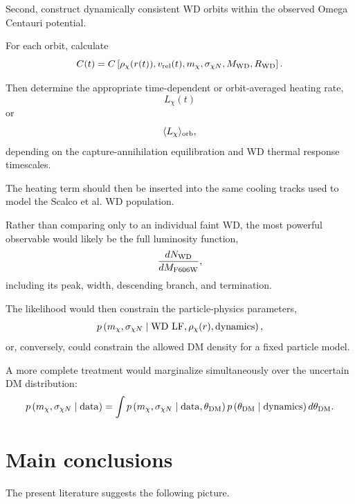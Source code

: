 \documentclass[11pt,a4paper]{article}
\begin{document}
Second, construct dynamically consistent WD orbits within the observed Omega Centauri potential.

For each orbit, calculate
\begin{equation}
C(t)
=
C\left[
\rho_\chi(r(t)),
v_{\rm rel}(t),
m_\chi,
\sigma_{\chi N},
M_{\rm WD},
R_{\rm WD}
\right].
\end{equation}

Then determine the appropriate time-dependent or orbit-averaged heating rate,
\begin{equation}
L_\chi(t)
\end{equation}
or
\begin{equation}
\langle L_\chi\rangle_{\rm orb},
\end{equation}
depending on the capture-annihilation equilibration and WD thermal response timescales.

The heating term should then be inserted into the same cooling tracks used to model the Scalco et al. WD population.

Rather than comparing only to an individual faint WD, the most powerful observable would likely be the full luminosity function,
\begin{equation}
\frac{dN_{\rm WD}}{dM_{\rm F606W}},
\end{equation}
including its peak, width, descending branch, and termination.

The likelihood would then constrain the particle-physics parameters,
\begin{equation}
p
\left(
m_\chi,
\sigma_{\chi N}
\mid
{\rm WD\ LF},
\rho_\chi(r),
{\rm dynamics}
\right),
\end{equation}
or, conversely, could constrain the allowed DM density for a fixed particle model.

A more complete treatment would marginalize simultaneously over the uncertain DM distribution:
\begin{equation}
p
\left(
m_\chi,
\sigma_{\chi N}
\mid
{\rm data}
\right)
=
\int
p
\left(
m_\chi,
\sigma_{\chi N}
\mid
{\rm data},
\theta_{\rm DM}
\right)
p
\left(
\theta_{\rm DM}
\mid
{\rm dynamics}
\right)
d\theta_{\rm DM}.
\end{equation}


\section{Main conclusions}

The present literature suggests the following picture.
\end{document}
